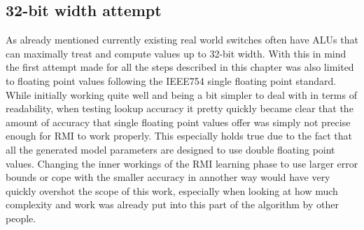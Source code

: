 \subsection{32-bit width attempt}
As already mentioned currently existing real world switches often have ALUs that can maximally treat and compute values up to 32-bit width. With this in mind the first attempt made for all the steps described in this chapter was also limited to floating point values following the IEEE754 single floating point standard. While initially working quite well and being a bit simpler to deal with in terms of readability, when testing lookup accuracy it pretty quickly became clear that the amount of accuracy that single floating point values offer was simply not precise enough for RMI to work properly. This especially holds true due to the fact that all the generated model parameters are designed to use double floating point values. Changing the inner workings of the RMI learning phase to use larger error bounds or cope with the smaller accuracy in annother way would have very quickly overshot the scope of this work, especially when looking at how much complexity and work was already put into this part of the algorithm by other people.

